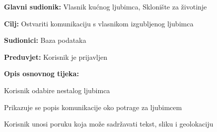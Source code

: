 \pagebreak
\noindent {}
\begin{packed_item}

	\item \textbf{Glavni sudionik: }Vlasnik kućnog ljubimca, Sklonište za životinje
	\item  \textbf{Cilj:} Ostvariti komunikaciju s vlasnikom izgubljenog ljubimca
	\item  \textbf{Sudionici:} Baza podataka
	\item  \textbf{Preduvjet:} Korisnik je prijavljen
	\item  \textbf{Opis osnovnog tijeka:}

	\item[] \begin{packed_enum}

		\item Korisnik odabire nestalog ljubimca
		\item Prikazuje se popis komunikacije oko potrage za ljubimcem
		\item Korisnik unosi poruku koja može sadržavati tekst, sliku i geolokaciju
	\end{packed_enum}
\end{packed_item}


